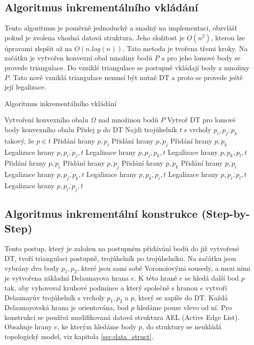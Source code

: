 \documentclass[12pt,a4paper]{article}
\begin{document}
\newpage
\subsection{Algoritmus inkrementálního vkládání}
\label{subsec:Inc_alg}

Tento algoritmus je poměrně jednoduchý a snadný na implementaci,
obzvlášť pokud je zvolena vhodná datová struktura. Jeho složitost je
$O(n^2)$, kterou lze úpravami zlepšit až na $O(n.log(n))$. Tato
metoda je tvořena třemi kroky. Na začátku je vytvořen konvexní obal
množiny bodů $P$ a pro jeho lomové body se provede triangulace. Do
vzniklé triangulace se postupně vkládají body z množiny $P$. Tato nově
vzniklá triangulace nemusí být nutně DT a proto se provede ještě její
legalizace.

\begin{algorithm}
\caption{Algoritmus inkrementálního vkládání}
\begin{algorithmic}[1]
\State Vytvoření konvexního obalu $\Omega$ nad množinou bodů $P$
\State Vytvoř DT pro lomové body konvexního obalu
	\State Přidej p do DT
	\State Najdi trojúhelník $t$ s vrcholy $p_i, p_j, p_k$ takový, že $p \in t$
		\State Přidání hrany $\overline{p,p_i}$
		\State Přidání hrany $\overline{p,p_j}$
		\State Přidání hrany $\overline{p,p_k}$
		\State Legalizace hrany $p,\overline{p_i,p_j},t$
		\State Legalizace hrany $p,\overline{p_j,p_k},t$
		\State Legalizace hrany $p,\overline{p_k,p_l},t$
		\State Přidání hrany $\overline{p,p_i}$
		\State Přidání hrany $\overline{p,p_j}$
		\State Přidání hrany $\overline{p,p_k}$
		\State Přidání hrany $\overline{p,p_l}$
		\State Legalizace hrany $p,\overline{p_j,p_k},t$
		\State Legalizace hrany $p,\overline{p_k,p_i},t$
		\State Legalizace hrany $p,\overline{p_i,p_l},t$
		\State Legalizace hrany $p,\overline{p_l,p_j},t$
	\EndIf
\EndFor
\end{algorithmic}
\end{algorithm}

\newpage
\subsection{Algoritmus inkrementální konstrukce (Step-by-Step)}

Tento postup, který je založen na postupném přidávání bodů do již
vytvořené DT, tvoří triangulaci postupně, trojúhelník po
trojúhelníku. Na začátku jsou vybrány dva body $p_1, p_2$, které jsou
sami sobě Voronoiovými sousedy, a mezi nimi je vytvořena základní
Delaunayova hrana $e$. K této hraně $e$ se hledá další bod $p$ tak,
aby vyhovoval kruhové podmínce a který společně s hranou $e$ vytvoří
Delaunayův trojúhelník s vrcholy $p_1, p_2$ a $p$, který se zapíše do
DT. Každá Delaunayovská hrana je orientována, bod $p$ hledáme pouze
vlevo od ní. Pro konstrukci se používá modifikovaná datová struktura
AEL (Active Edge List). Obsahuje hrany $e$, ke kterým hledáme body
$p$, do struktury se neukládá topologický model, viz kapitola
\ref{sec:data_struct}.
\end{document}
